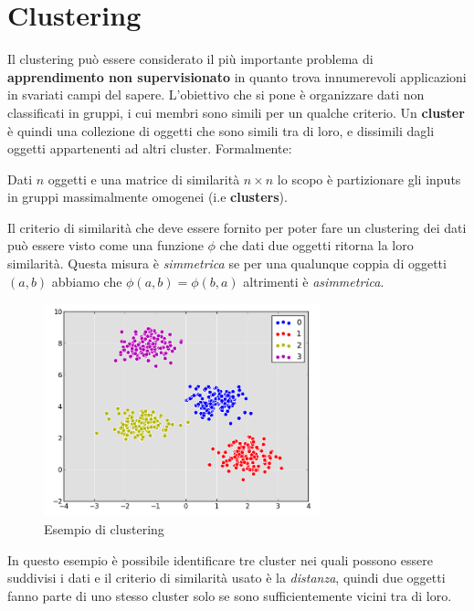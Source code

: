 \chapter{Clustering} %
\label{cha:clustering}

Il clustering può essere considerato il più importante problema di \textbf{apprendimento non supervisionato} in quanto trova innumerevoli applicazioni in svariati campi del sapere. L’obiettivo che si pone è organizzare dati non classificati in gruppi, i cui membri sono simili per un qualche criterio. Un \textbf{cluster} è quindi una collezione di oggetti che sono simili tra di loro, e dissimili dagli oggetti appartenenti ad altri cluster. Formalmente:

\begin{mydef}
	Dati $n$ oggetti e una matrice di similarità $n \times n$ lo scopo è partizionare gli inputs in gruppi massimalmente omogenei (i.e \textbf{clusters}).
\end{mydef}

Il criterio di similarità che deve essere fornito per poter fare un clustering dei dati può essere visto come una funzione $\phi$ che dati due oggetti ritorna la loro similarità. Questa misura è \emph{simmetrica} se per una qualunque coppia di oggetti $(a, b)$ abbiamo che $\phi(a, b) = \phi(b, a)$ altrimenti è \emph{asimmetrica}.\\

\begin{figure}[h!]
	\centering
	\includegraphics[width=8cm]{images/clustering.png}
	\caption{Esempio di clustering}\label{fig:clusters}
\end{figure}

In questo esempio è possibile identificare tre cluster nei quali possono essere suddivisi i dati e il criterio di similarità usato è la \emph{distanza}, quindi due oggetti fanno parte di uno stesso cluster solo se sono sufficientemente vicini tra di loro. 

